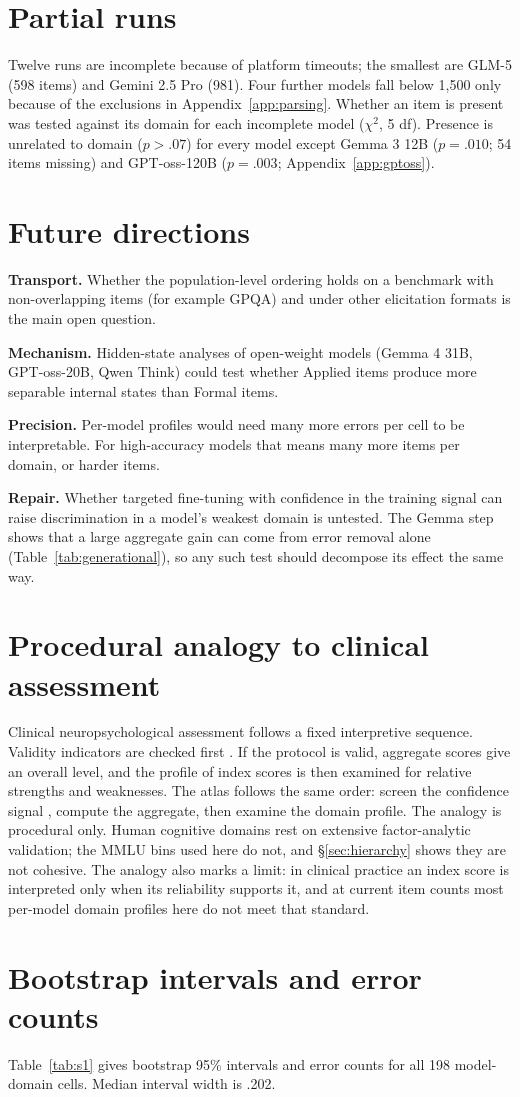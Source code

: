 \section{Partial runs}
\label{app:partial}

Twelve runs are incomplete because of platform timeouts; the smallest are GLM-5 (598 items) and Gemini 2.5 Pro (981). Four further models fall below 1{,}500 only because of the exclusions in Appendix~\ref{app:parsing}. Whether an item is present was tested against its domain for each incomplete model ($\chi^2$, 5 df). Presence is unrelated to domain ($p > .07$) for every model except Gemma 3 12B ($p = .010$; 54 items missing) and GPT-oss-120B ($p = .003$; Appendix~\ref{app:gptoss}).

\section{Future directions}

\textbf{Transport.} Whether the population-level ordering holds on a benchmark with non-overlapping items (for example GPQA) and under other elicitation formats is the main open question.

\textbf{Mechanism.} Hidden-state analyses of open-weight models (Gemma 4 31B, GPT-oss-20B, Qwen Think) could test whether Applied items produce more separable internal states than Formal items.

\textbf{Precision.} Per-model profiles would need many more errors per cell to be interpretable. For high-accuracy models that means many more items per domain, or harder items.

\textbf{Repair.} Whether targeted fine-tuning with confidence in the training signal can raise discrimination in a model's weakest domain is untested. The Gemma step shows that a large aggregate gain can come from error removal alone (Table~\ref{tab:generational}), so any such test should decompose its effect the same way.

\section{Procedural analogy to clinical assessment}
\label{app:neuropsych}

Clinical neuropsychological assessment follows a fixed interpretive sequence. Validity indicators are checked first \citep{larrabee2012}. If the protocol is valid, aggregate scores give an overall level, and the profile of index scores is then examined for relative strengths and weaknesses. The atlas follows the same order: screen the confidence signal \citep{cacioli2026e}, compute the aggregate, then examine the domain profile. The analogy is procedural only. Human cognitive domains rest on extensive factor-analytic validation; the MMLU bins used here do not, and \S\ref{sec:hierarchy} shows they are not cohesive. The analogy also marks a limit: in clinical practice an index score is interpreted only when its reliability supports it, and at current item counts most per-model domain profiles here do not meet that standard.

\section{Bootstrap intervals and error counts}
\label{app:ci}

Table~\ref{tab:s1} gives bootstrap 95\% intervals and error counts for all 198 model-domain cells. Median interval width is .202.


